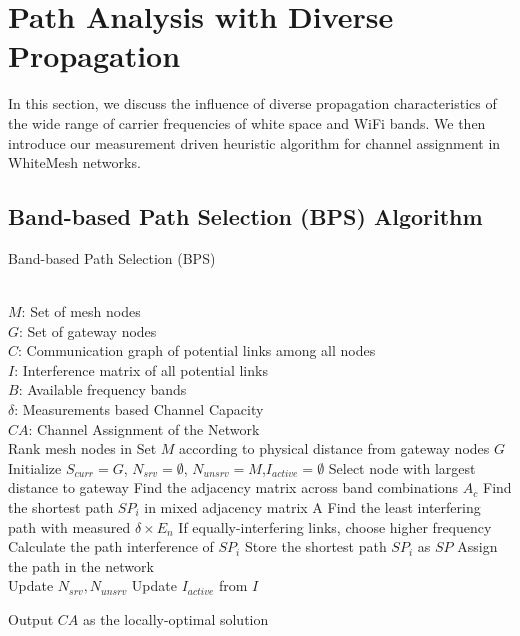 \section{Path Analysis with Diverse Propagation}
\label{sec:wmalgorithms}


In this section, we discuss the influence of diverse propagation
characteristics of the wide range of carrier frequencies of
white space and WiFi bands. We then introduce our measurement 
driven heuristic algorithm for channel assignment in 
WhiteMesh networks.



\subsection{Band-based Path Selection (BPS) Algorithm}
\label{subsec:BPS}

\begin{algorithm}[t]
    \small
\caption{Band-based Path Selection (BPS)}
\label{algorithms:bps}
\begin{algorithmic}[1]
\REQUIRE  ~~\\
	$M$: Set of mesh nodes\\
	$G$: Set of gateway nodes\\
	$C$: Communication graph of potential links among all nodes\\
	$I$: Interference matrix of all potential links \\
	$B$: Available frequency bands \\
	$\delta$: Measurements based Channel Capacity
\ENSURE ~~\\    
$CA$: Channel Assignment of the Network\\
\STATE Rank mesh nodes in Set $M$ according to physical distance from gateway nodes $G$
\STATE Initialize $S_{curr}=G$, $N_{srv}=\emptyset$, $N_{unsrv}=M$,$I_{active}=\emptyset$
\STATE Select node with largest distance to gateway
\STATE Find the adjacency matrix across band combinations $A_c$
\STATE Find the shortest path $SP_i$ in mixed adjacency matrix A 
\STATE Find the least interfering path with measured $\delta \times E_n$
\STATE If equally-interfering links, choose higher frequency
\STATE Calculate the path interference of $SP_i$
\ENDFOR
\STATE Store the shortest path $SP_i$ as $SP$
\ENDFOR
\STATE Assign the path in the network\\
		\STATE Update $N_{srv},N_{unsrv}$
		\STATE Update $I_{active}$ from $I$
\ENDWHILE 

Output $CA$ as the locally-optimal solution\\
\end{algorithmic}
\end{algorithm}

